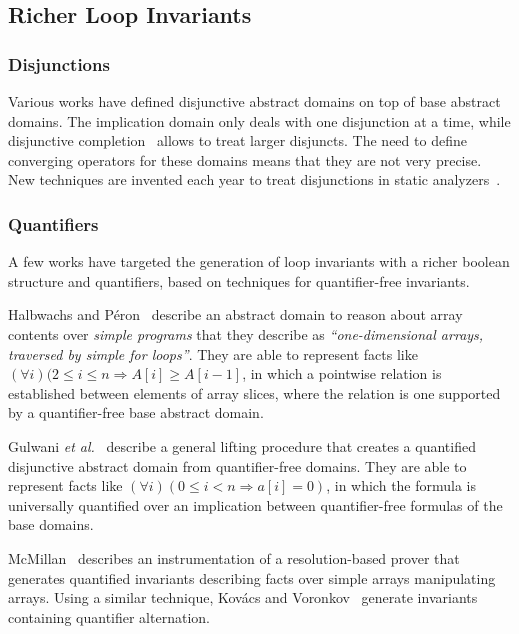 \documentclass[a4paper,10pt]{article}
\newcommand{\etal}{\textit{et al.}\xspace}
\newcommand{\impl}{\ensuremath{\Longrightarrow}}
\begin{document}
\subsection{Richer Loop Invariants}

\subsubsection*{Disjunctions}

Various works have defined disjunctive abstract domains on top of base abstract
domains. The implication domain only deals with one disjunction at a time,
while disjunctive completion~\cite{Mauborgne:trace-partitioning} allows to
treat larger disjuncts. The need to define converging operators for these
domains means that they are not very precise. New techniques are invented each
year to treat disjunctions in static analyzers~\cite{Harris:2010:PAV,
  Sharma:2011:cav}.

\subsubsection*{Quantifiers}

A few works have targeted the generation of loop invariants with a richer
boolean structure and quantifiers, based on techniques for quantifier-free
invariants.

Halbwachs and Péron~\cite{halbwachs:2008:pldi} describe an abstract domain to
reason about array contents over \textit{simple programs} that they describe as
\textit{``one-dimensional arrays, traversed by simple for loops''}. They are
able to represent facts like $(\forall i)(2 \leq i \leq n \impl A[i] \geq
A[i−1]$, in which a pointwise relation is established between elements of array
slices, where the relation is one supported by a quantifier-free base abstract
domain.

Gulwani \etal~\cite{gulwani:2008:popl} describe a general lifting procedure
that creates a quantified disjunctive abstract domain from quantifier-free
domains. They are able to represent facts like $(\forall i)(0 \leq i < n \impl
a[i] = 0)$, in which the formula is universally quantified over an implication
between quantifier-free formulas of the base domains.

McMillan~\cite{mcmillan:2008:tacas} describes an instrumentation of a
resolution-based prover that generates quantified invariants describing facts
over simple arrays manipulating arrays. Using a similar technique, Kov\'acs and
Voronkov~\cite{kovacs:2009:fli} generate invariants containing quantifier
alternation.
\end{document}
